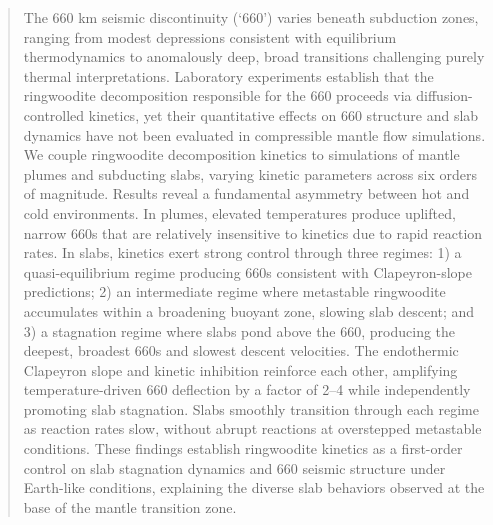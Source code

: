 \documentclass[draft,linenumbers]{agujournal2019}
\begin{document}
\begin{abstract}
The 660 km seismic discontinuity (`660') varies beneath subduction
zones, ranging from modest depressions consistent with equilibrium
thermodynamics to anomalously deep, broad transitions challenging purely
thermal interpretations. Laboratory experiments establish that the
ringwoodite decomposition responsible for the 660 proceeds via
diffusion-controlled kinetics, yet their quantitative effects on 660
structure and slab dynamics have not been evaluated in compressible
mantle flow simulations. We couple ringwoodite decomposition kinetics to
simulations of mantle plumes and subducting slabs, varying kinetic
parameters across six orders of magnitude. Results reveal a fundamental
asymmetry between hot and cold environments. In plumes, elevated
temperatures produce uplifted, narrow 660s that are relatively
insensitive to kinetics due to rapid reaction rates. In slabs, kinetics
exert strong control through three regimes: 1) a quasi-equilibrium
regime producing 660s consistent with Clapeyron-slope predictions; 2) an
intermediate regime where metastable ringwoodite accumulates within a
broadening buoyant zone, slowing slab descent; and 3) a stagnation
regime where slabs pond above the 660, producing the deepest, broadest
660s and slowest descent velocities. The endothermic Clapeyron slope and
kinetic inhibition reinforce each other, amplifying temperature-driven
660 deflection by a factor of 2--4 while independently promoting slab
stagnation. Slabs smoothly transition through each regime as reaction
rates slow, without abrupt reactions at overstepped metastable
conditions. These findings establish ringwoodite kinetics as a
first-order control on slab stagnation dynamics and 660 seismic
structure under Earth-like conditions, explaining the diverse slab
behaviors observed at the base of the mantle transition zone.
\end{abstract}
\end{document}
